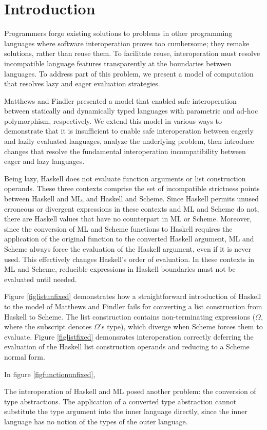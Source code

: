 \section{Introduction}

Programmers forgo existing solutions to problems in other programming languages where software interoperation proves too cumbersome; they remake solutions, rather than reuse them. To facilitate reuse, interoperation must resolve incompatible language features transparently at the boundaries between languages. To address part of this problem, we present a model of computation that resolves lazy and eager evaluation strategies.

Matthews and Findler presented \cite{matthews07} a model that enabled safe interoperation between statically and dynamically typed languages with parametric and ad-hoc polymorphism, respectively. We extend this model in various ways to demonstrate that it is insufficient to enable safe interoperation between eagerly and lazily evaluated languages, analyze the underlying problem, then introduce changes that resolve the fundamental interoperation incompatibility between eager and lazy languages.

Being lazy, Haskell does not evaluate function arguments or list construction operands. These three contexts comprise the set of incompatible strictness points between Haskell and ML, and Haskell and Scheme. Since Haskell permits unused erroneous or divergent expressions in these contexts and ML and Scheme do not, there are Haskell values that have no counterpart in ML or Scheme. Moreover, since the conversion of ML and Scheme functions to Haskell requires the application of the original function to the converted Haskell argument, ML and Scheme always force the evaluation of the Haskell argument, even if it is never used. This effectively changes Haskell's order of evaluation. In these contexts in ML and Scheme, reducible expressions in Haskell boundaries must not be evaluated until needed.

Figure \ref{figlistunfixed} demonstrates how a straightforward introduction of Haskell to the model of Matthews and Findler fails for converting a list construction from Haskell to Scheme. The list construction contains non-terminating expressions ($\Omega$, where the subscript denotes $\Omega$'s type), which diverge when Scheme forces them to evaluate. Figure \ref{figlistfixed} demonsrates interoperation correctly deferring the evaluation of the Haskell list construction operands and reducing to a Scheme normal form.

In figure \ref{figfunctionunfixed}, 









The interoperation of Haskell and ML posed another problem: the conversion of type abstractions. The application of a converted type abstraction cannot substitute the type argument into the inner language directly, since the inner language has no notion of the types of the outer language.